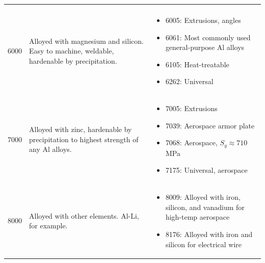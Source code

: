\documentclass[
10pt,
a4paper,
openany,
svgnames,
]{book}
\begin{document}
\begin{table}[H]
\begin{tabular}{lp{6cm}p{6cm}}
\begin{itemize}
    \end{itemize} \\
    6000 & Alloyed with magnesium and silicon. Easy to machine, weldable, hardenable by precipitation. & \begin{itemize}
    \item 6005: Extrusions, angles
    \item 6061: Most commonly used general-purpose Al alloys
    \item 6105: Heat-treatable
    \item 6262: Universal 
    \end{itemize} \\
    7000 & Alloyed with zinc, hardenable by precipitation to highest strength of any Al alloys. & \begin{itemize}
    \item 7005: Extrusions
    \item 7039: Aerospace armor plate
    \item 7068: Aerospace, $S_y \approx 710$ MPa
    \item 7175: Universal, aerospace
    \end{itemize} \\
    8000 & Alloyed with other elements. Al-Li, for example. & \begin{itemize}
    \item 8009: Alloyed with iron, silicon, and vanadium for high-temp aerospace
    \item 8176: Alloyed with iron and silicon for electrical wire
    \end{itemize} \\
    \bottomrule
  \end{tabular}
\end{table}
\end{document}

